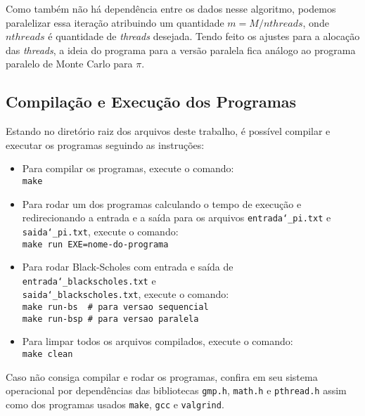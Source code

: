 Como também não há dependência entre os dados nesse algoritmo, podemos paralelizar essa iteração atribuindo um quantidade $m = M / nthreads$, onde $nthreads$ é quantidade de \textit{threads} desejada. Tendo feito os ajustes para a alocação das \textit{threads}, a ideia do programa para a versão paralela fica análogo ao programa paralelo de Monte Carlo para $\pi$.

\subsection{Compilação e Execução dos Programas}

Estando no diretório raiz dos arquivos deste trabalho, é possível compilar e executar os programas seguindo as instruções:

\begin{itemize}
	\item Para compilar os programas, execute o comando: \\
		\verb|make|

	\item Para rodar um dos programas calculando o tempo de execução e redirecionando
	a entrada e a saída para os arquivos \texttt{entrada\char`_pi.txt} e \texttt{saida\char`_pi.txt},
	execute o comando: \\
		\verb|make run EXE=nome-do-programa|

	\item Para rodar Black-Scholes com entrada e saída de \texttt{entrada\char`_blackscholes.txt} e\\ \texttt{saida\char`_blackscholes.txt}, execute o comando: \\
		\verb|make run-bs  # para versao sequencial|  \\
		\verb|make run-bsp # para versao paralela|

	\item Para limpar todos os arquivos compilados, execute o comando: \\
		\verb|make clean|

\end{itemize}

Caso não consiga compilar e rodar os programas, confira em seu sistema operacional por dependências das bibliotecas \texttt{gmp.h}, \texttt{math.h} e \texttt{pthread.h} assim como dos programas usados \texttt{make}, \texttt{gcc} e \texttt{valgrind}.

